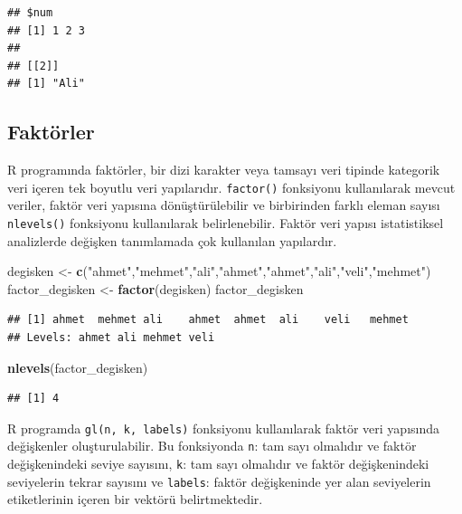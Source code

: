 \documentclass[
]{book}
\newenvironment{Shaded}{\begin{snugshade}}{\end{snugshade}}
\newcommand{\FunctionTok}[1]{\textcolor[rgb]{0.13,0.29,0.53}{\textbf{#1}}}
\newcommand{\NormalTok}[1]{#1}
\newcommand{\OtherTok}[1]{\textcolor[rgb]{0.56,0.35,0.01}{#1}}
\newcommand{\StringTok}[1]{\textcolor[rgb]{0.31,0.60,0.02}{#1}}
\begin{document}
\begin{verbatim}
## $num
## [1] 1 2 3
## 
## [[2]]
## [1] "Ali"
\end{verbatim}

\subsection{Faktörler}\label{faktuxf6rler}

R programında faktörler, bir dizi karakter veya tamsayı veri tipinde kategorik veri içeren tek boyutlu veri yapılarıdır. \texttt{factor()} fonksiyonu kullanılarak mevcut veriler, faktör veri yapısına dönüştürülebilir ve birbirinden farklı eleman sayısı \texttt{nlevels()} fonksiyonu kullanılarak belirlenebilir. Faktör veri yapısı istatistiksel analizlerde değişken tanımlamada çok kullanılan yapılardır.

\begin{Shaded}
\begin{Highlighting}[]
\NormalTok{degisken }\OtherTok{\textless{}{-}} \FunctionTok{c}\NormalTok{(}\StringTok{"ahmet"}\NormalTok{,}\StringTok{"mehmet"}\NormalTok{,}\StringTok{"ali"}\NormalTok{,}\StringTok{"ahmet"}\NormalTok{,}\StringTok{"ahmet"}\NormalTok{,}\StringTok{"ali"}\NormalTok{,}\StringTok{"veli"}\NormalTok{,}\StringTok{"mehmet"}\NormalTok{)}
\NormalTok{factor\_degisken }\OtherTok{\textless{}{-}} \FunctionTok{factor}\NormalTok{(degisken)}
\NormalTok{factor\_degisken}
\end{Highlighting}
\end{Shaded}

\begin{verbatim}
## [1] ahmet  mehmet ali    ahmet  ahmet  ali    veli   mehmet
## Levels: ahmet ali mehmet veli
\end{verbatim}

\begin{Shaded}
\begin{Highlighting}[]
\FunctionTok{nlevels}\NormalTok{(factor\_degisken)}
\end{Highlighting}
\end{Shaded}

\begin{verbatim}
## [1] 4
\end{verbatim}

R programda \texttt{gl(n,\ k,\ labels)} fonksiyonu kullanılarak faktör veri yapısında değişkenler oluşturulabilir. Bu fonksiyonda \texttt{n}: tam sayı olmalıdır ve faktör değişkenindeki seviye sayısını, \texttt{k}: tam sayı olmalıdır ve faktör değişkenindeki seviyelerin tekrar sayısını ve \texttt{labels}: faktör değişkeninde yer alan seviyelerin etiketlerinin içeren bir vektörü belirtmektedir.
\end{document}
